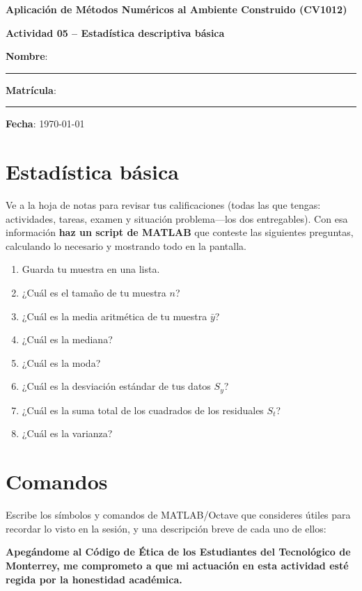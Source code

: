 \documentclass[spanish, 10pt]{article}
\begin{document}
\begin{center}
    {\Large \textbf{Aplicación de Métodos Numéricos al Ambiente Construido (CV1012)}}
	
	\bigskip
	{\large \textbf{Actividad 05 -- Estadística descriptiva básica}}
\end{center}

\bigskip
{\large \textbf{Nombre}: \rule{13.7 cm}{0.4mm}}



\bigskip
{\large \textbf{Matrícula}: \rule{5 cm}{0.4mm}} \hfill {\large \textbf{Fecha}: \today}

\bigskip


\section{Estadística básica}

Ve a la hoja de notas para revisar tus calificaciones (todas las que tengas: actividades, tareas, examen y situación problema---los dos entregables). Con esa información \textbf{haz un script de MATLAB} que conteste las siguientes preguntas, calculando lo necesario y mostrando todo en la pantalla.

\vspace{6ex}

\begin{enumerate}
    \itemsep2.5ex
    \item Guarda tu muestra en una lista.
    \item ¿Cuál es el tamaño de tu muestra $n$?
    \item ¿Cuál es la media aritmética de tu muestra $\bar{y}$?
    \item ¿Cuál es la mediana?
    \item ¿Cuál es la moda?
    \item ¿Cuál es la desviación estándar de tus datos $S_y$?
    \item ¿Cuál es la suma total de los cuadrados de los residuales $S_t$?
    \item ¿Cuál es la varianza?
\end{enumerate}

\pagebreak

\section{Comandos}

Escribe los símbolos y comandos de MATLAB/Octave que consideres útiles para recordar lo visto en la sesión, y una descripción breve de cada uno de ellos:

\vfill

\textbf{Apegándome al Código de Ética de los Estudiantes del Tecnológico de Monterrey, me comprometo a que mi actuación en esta actividad esté regida por la honestidad académica.}
\end{document}
